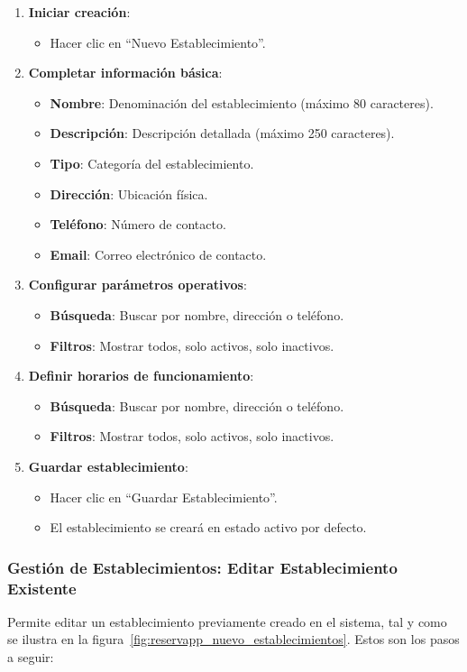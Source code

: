 \begin{enumerate}
   \item \textbf{Iniciar creación}:
   \begin{itemize}
      \item Hacer clic en ``Nuevo Establecimiento''.
   \end{itemize}
   \item \textbf{Completar información básica}:
   \begin{itemize}
      \item \textbf{Nombre}: Denominación del establecimiento (máximo 80 caracteres).
      \item \textbf{Descripción}: Descripción detallada (máximo 250 caracteres).
	  \item \textbf{Tipo}: Categoría del establecimiento.
	  \item \textbf{Dirección}: Ubicación física.
	  \item \textbf{Teléfono}: Número de contacto.
	  \item \textbf{Email}: Correo electrónico de contacto.
   \end{itemize}
   \item \textbf{Configurar parámetros operativos}:
   \begin{itemize}
      \item \textbf{Búsqueda}: Buscar por nombre, dirección o teléfono.
	  \item \textbf{Filtros}: Mostrar todos, solo activos, solo inactivos.
   \end{itemize}
   \item \textbf{Definir horarios de funcionamiento}:
   \begin{itemize}
      \item \textbf{Búsqueda}: Buscar por nombre, dirección o teléfono.
	  \item \textbf{Filtros}: Mostrar todos, solo activos, solo inactivos.
   \end{itemize}
   \item \textbf{Guardar establecimiento}:
   \begin{itemize}
      \item Hacer clic en ``Guardar Establecimiento''.
	  \item El establecimiento se creará en estado activo por defecto.
   \end{itemize}
\end{enumerate}

\subsubsection{Gestión de Establecimientos: Editar Establecimiento Existente}
Permite editar un establecimiento previamente creado en el sistema, tal y como se ilustra en la figura~\ref{fig:reservapp_nuevo_establecimientos}. Estos son los pasos a seguir:

